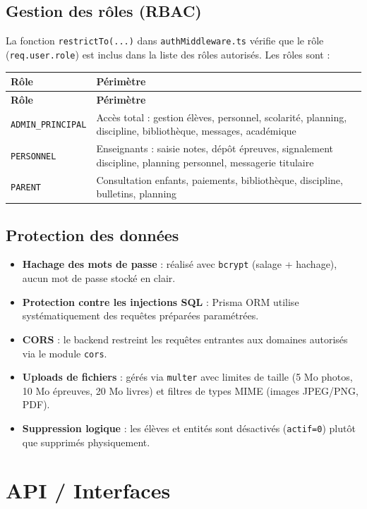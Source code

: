 \documentclass[12pt,a4paper]{report}
\begin{document}
\section{Gestion des rôles (RBAC)}
La fonction \texttt{restrictTo(...)} dans \texttt{authMiddleware.ts} vérifie que le rôle (\texttt{req.user.role}) est inclus dans la liste des rôles autorisés. Les rôles sont :
\begin{longtable}{|p{3.5cm}|p{11cm}|}
\hline
\textbf{Rôle} & \textbf{Périmètre} \\
\hline
\endfirsthead
\hline
\textbf{Rôle} & \textbf{Périmètre} \\
\hline
\endhead
\texttt{ADMIN\_PRINCIPAL} & Accès total : gestion élèves, personnel, scolarité, planning, discipline, bibliothèque, messages, académique \\
\hline
\texttt{PERSONNEL} & Enseignants : saisie notes, dépôt épreuves, signalement discipline, planning personnel, messagerie titulaire \\
\hline
\texttt{PARENT} & Consultation enfants, paiements, bibliothèque, discipline, bulletins, planning \\
\hline
\end{longtable}
 
\section{Protection des données}
\begin{itemize}[leftmargin=*]
    \item \textbf{Hachage des mots de passe} : réalisé avec \texttt{bcrypt} (salage + hachage), aucun mot de passe stocké en clair.
    \item \textbf{Protection contre les injections SQL} : Prisma ORM utilise systématiquement des requêtes préparées paramétrées.
    \item \textbf{CORS} : le backend restreint les requêtes entrantes aux domaines autorisés via le module \texttt{cors}.
    \item \textbf{Uploads de fichiers} : gérés via \texttt{multer} avec limites de taille (5 Mo photos, 10 Mo épreuves, 20 Mo livres) et filtres de types MIME (images JPEG/PNG, PDF).
    \item \textbf{Suppression logique} : les élèves et entités sont désactivés (\texttt{actif=0}) plutôt que supprimés physiquement.
\end{itemize}
 
\chapter{API / Interfaces}
 
\end{document}
